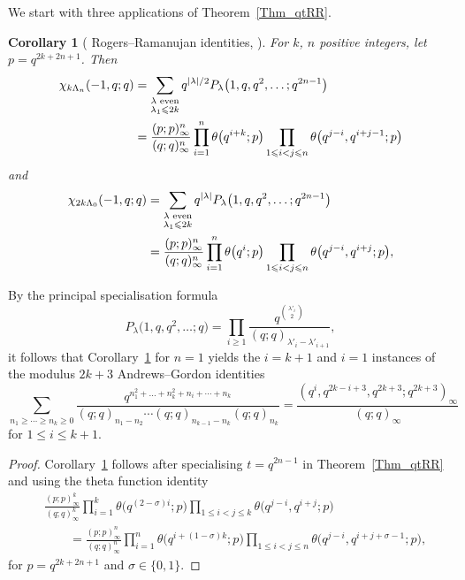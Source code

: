 \documentclass[pdftex]{sigma}
\numberwithin{equation}{section}
\newtheorem{Corollary}[Theorem]{Corollary}
\renewcommand{\leq}{\leqslant}
\renewcommand{\geq}{\geqslant}
\newcommand{\abs}[1]{\vert#1\vert}
\newcommand{\la}{\lambda}
\newcommand{\La}{\Lambda}
\begin{document}
We start with three applications of Theorem~\ref{Thm_qtRR}.

\begin{Corollary}[ Rogers--Ramanujan identities,
{\cite[Theorem 1.1]{GOW16}}]\label{Cor_1}
For $k$, $n$ positive integers, let $p=q^{2k+2n+1}$.
Then
\begin{align}
\begin{aligned}[b]
\chi_{k\La_n}(-1,q;q)&=
\sum_{\substack{\la \textup{ even} \\[1pt] \la_1\leq 2k}}
q^{\abs{\la}/2} P_{\la}\bigl(1,q,q^2,\dots;q^{2n-1}\bigr)  \\
&=\frac{(p;p)_{\infty}^n}{(q;q)_{\infty}^n}
\prod_{i=1}^n \theta\bigl(q^{i+k};p\bigr)
\prod_{1\leq i<j\leq n} \theta\bigl(q^{j-i},q^{i+j-1};p\bigr)
\end{aligned}
\label{Eq_GOW1}
\end{align}
and
\begin{align}
\chi_{2k\La_0}(-1,q;q)&=
\sum_{\substack{\la \textup{ even} \\[1pt] \la_1\leq 2k}}
q^{\abs{\la}} P_{\la}\bigl(1,q,q^2,\dots;q^{2n-1}\bigr) \notag \\
&=\frac{(p;p)_{\infty}^n}{(q;q)_{\infty}^n}
\prod_{i=1}^n \theta\bigl(q^i;p\bigr)
\prod_{1\leq i<j\leq n} \theta\bigl(q^{j-i},q^{i+j};p\bigr),
\label{Eq_GOW2}
\end{align}
\end{Corollary}

By the principal specialisation formula \cite[p.~213]{Macdonald95}
\begin{equation}\label{Eq_PS}
P_{\la}\bigl(1,q,q^2,\dots;q\bigr)=
\prod_{i\geq 1} \frac{q^{\binom{\la'_i}{2}}}
{(q;q)_{\la'_i-\la'_{i+1}}},
\end{equation}
it follows that Corollary~\ref{Cor_1} for $n=1$ yields the
$i=k+1$ and $i=1$ instances of the modulus $2k+3$ Andrews--Gordon
identities \cite{Andrews74}
\[
\sum_{n_1\geq\cdots\geq n_k\geq 0}
\frac{q^{n_1^2+\dots+n_k^2+n_i+\cdots+n_k}}
{(q;q)_{n_1-n_2}\cdots(q;q)_{n_{k-1}-n_k}(q;q)_{n_k}} =
\frac{(q^i,q^{2k-i+3},q^{2k+3};q^{2k+3})_{\infty}}{(q;q)_{\infty}}
\]
for $1\leq i\leq k+1$.

\begin{proof}
Corollary~\ref{Cor_1} follows after specialising $t=q^{2n-1}$ in
Theorem~\ref{Thm_qtRR} and using the theta function identity
\begin{align*}
&\frac{(p;p)_{\infty}^k}{(q;q)_{\infty}^k}
\prod_{i=1}^k \theta\bigl(q^{(2-\sigma)i};p\bigr)
\prod_{1\leq i<j\leq k} \theta\bigl(q^{j-i},q^{i+j};p\bigr) \\
&\qquad=\frac{(p;p)_{\infty}^n}{(q;q)_{\infty}^n}
\prod_{i=1}^n \theta\bigl(q^{i+(1-\sigma)k};p\bigr)
\prod_{1\leq i<j\leq n} \theta\bigl(q^{j-i},q^{i+j+\sigma-1};p\bigr),
\end{align*}
for $p=q^{2k+2n+1}$ and $\sigma\in\{0,1\}$.
\end{proof}
\end{document}
